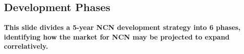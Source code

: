 
\begin{frame}{}
\section{Development Phases}


\vspace{-1em}

{\hspace{1.5em}\begin{minipage}[l]{.9\textwidth}\Large\centering\color{slidePartHeadColor} 	
{\LARGE \textbf{This slide divides a 5-year NCN development 
strategy into 6 phases, identifying how the market for 
NCN may be projected to expand correlatively.}}
\vspace{.7em}	
\end{minipage}}	



\end{frame}
